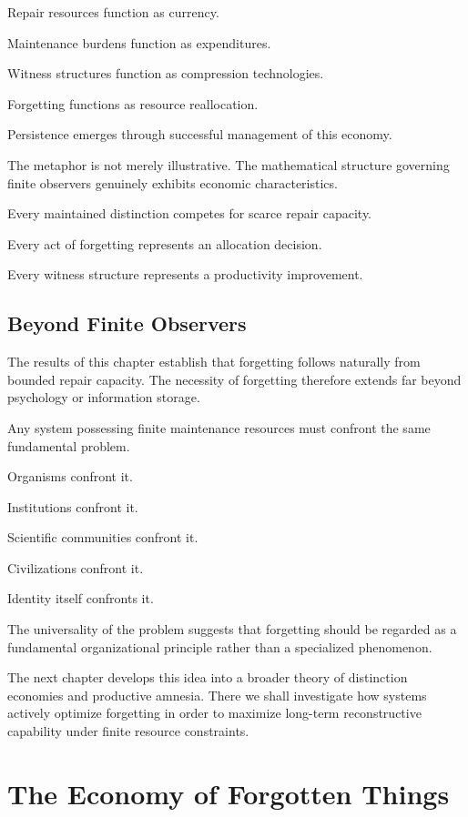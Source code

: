 \documentclass[12pt,oneside]{book}
\theoremstyle{plain} \newtheorem{theorem}{Theorem}[chapter] \newtheorem{lemma}[theorem]{Lemma} \newtheorem{proposition}[theorem]{Proposition} \newtheorem{corollary}[theorem]{Corollary}
\theoremstyle{definition} \newtheorem{definition}[theorem]{Definition} \newtheorem{axiom}[theorem]{Axiom} \newtheorem{construction}[theorem]{Construction}
\theoremstyle{remark} \newtheorem{remark}[theorem]{Remark} \newtheorem{example}[theorem]{Example}
\begin{document}
Repair resources function as currency.

Maintenance burdens function as expenditures.

Witness structures function as compression technologies.

Forgetting functions as resource reallocation.

Persistence emerges through successful management of this economy.

The metaphor is not merely illustrative. The mathematical structure governing finite observers genuinely exhibits economic characteristics.

Every maintained distinction competes for scarce repair capacity.

Every act of forgetting represents an allocation decision.

Every witness structure represents a productivity improvement.

\section{Beyond Finite Observers}

The results of this chapter establish that forgetting follows naturally from bounded repair capacity. The necessity of forgetting therefore extends far beyond psychology or information storage.

Any system possessing finite maintenance resources must confront the same fundamental problem.

Organisms confront it.

Institutions confront it.

Scientific communities confront it.

Civilizations confront it.

Identity itself confronts it.

The universality of the problem suggests that forgetting should be regarded as a fundamental organizational principle rather than a specialized phenomenon.

The next chapter develops this idea into a broader theory of distinction economies and productive amnesia. There we shall investigate how systems actively optimize forgetting in order to maximize long-term reconstructive capability under finite resource constraints.

\chapter{The Economy of Forgotten Things}
\end{document}
